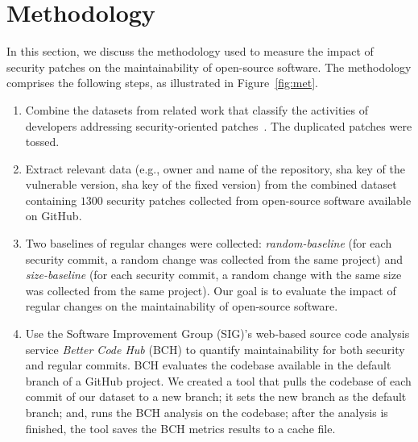 \documentclass[smallextended]{svjour3}       %
\begin{document}
\section{Methodology}\label{sec:methodology}
%

In this section, we discuss the methodology used to measure
the impact of security patches on the maintainability of open-source
software. The methodology comprises the following steps, as 
illustrated in Figure~\ref{fig:met}.
%
\begin{enumerate}
	\item Combine the datasets from related work that classify
	the activities of developers addressing security-oriented 
  patches~\cite{reis2017secbench,10.1109/MSR.2019.00064}. The
  duplicated patches were tossed.
%
	\item
	Extract relevant data (e.g., owner and name of
	the repository, sha key of the vulnerable version, sha key of 	
	the fixed version) from the combined dataset 	
	containing $1300$ security patches collected from open-source 	
	software available on GitHub.
%
  \item Two baselines of regular changes were collected:
  \textit{random-baseline} (for each security commit, a random change 
  was collected from the same project) and \textit{size-baseline} (for 
  each security commit, a random change with the same size
  was collected from the same project). Our goal is to evaluate the impact 
	of regular changes on the maintainability of open-source 
	software.
%
  \item Use the Software Improvement Group (SIG)'s web-based source 
  code analysis service \emph{Better Code Hub} (BCH)
  to quantify maintainability for both security and regular commits. 
  BCH evaluates the codebase available in the default branch of a GitHub project. 
  We created a tool that pulls the codebase of each commit of our dataset 
  to a new branch; it sets the new branch as the default branch; and, runs 
  the BCH analysis on the codebase; after the analysis is finished, the tool saves 
  the BCH metrics results to a cache file.
\end{enumerate}
%
\end{document}

